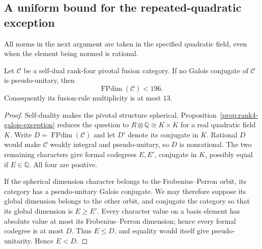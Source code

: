 \subsection{A uniform bound for the repeated-quadratic exception}
\label{sec:repeated-quadratic-bound}

All norms in the next argument are taken in the specified quadratic
field, even when the element being normed is rational.

\begin{theorem}\label{thm:non-galois-pu-bound}
Let $\mathcal C$ be a self-dual rank-four pivotal fusion category.
If no Galois conjugate of $\mathcal C$ is pseudo-unitary, then
\[
 \operatorname{FPdim}(\mathcal C)<196.
\]
Consequently its fusion-rule multiplicity is at most $13$.
\end{theorem}
\begin{proof}
Self-duality makes the pivotal structure spherical.
Proposition~\ref{prop:rank4-galois-exception} reduces the question to
$R\otimes\mathbb Q\cong K\times K$ for a real quadratic field $K$.
Write $D=\operatorname{FPdim}(\mathcal C)$ and let $D'$ denote its
conjugate in $K$. Rational $D$ would make $\mathcal C$ weakly integral
and pseudo-unitary, so $D$ is nonrational. The two remaining characters
give formal codegrees $E,E'$, conjugate in $K$, possibly equal if
$E\in\mathbb Q$. All four are positive.

If the spherical dimension character belongs to the Frobenius--Perron
orbit, its category has a pseudo-unitary Galois conjugate. We may
therefore suppose its global dimension belongs to the other orbit,
and conjugate the category so that its global dimension is
$E\geq E'$. Every character value on a basis element has absolute
value at most its Frobenius--Perron dimension; hence every formal
codegree is at most $D$. Thus $E\leq D$, and equality would itself
give pseudo-unitarity. Hence $E<D$.


\end{proof}
